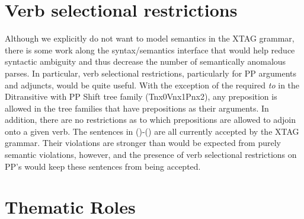 



\section{Verb selectional restrictions}

Although we explicitly do not want to model semantics in the XTAG grammar,
there is some work along the syntax/semantics interface that would help reduce
syntactic ambiguity and thus decrease the number of semantically anomalous
parses.  In particular, verb selectional restrictions, particularly for PP
arguments and adjuncts, would be quite useful.  With the exception of the
required {\it to} in the Ditransitive with PP Shift tree family (Tnx0Vnx1Pnx2),
any preposition is allowed in the tree families that have prepositions as their
arguments.  In addition, there are no restrictions as to which prepositions are
allowed to adjoin onto a given verb.  The sentences in ()-() are
all currently accepted by the XTAG grammar.  Their violations are stronger than
would be expected from purely semantic violations, however, and the presence of
verb selectional restrictions on PP's would keep these sentences from being
accepted.


\section{Thematic Roles}


